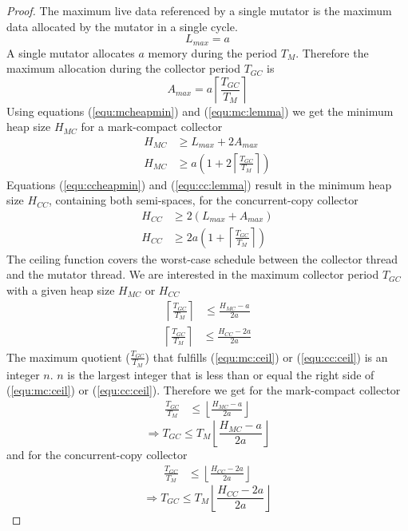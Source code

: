 \begin{proof}
The maximum live data referenced by a single mutator is the maximum
data allocated by the mutator in a single cycle.
\begin{equation}
    L_{max} = a
\end{equation}
A single mutator allocates $a$ memory during the period $T_M$.
Therefore the maximum allocation during the collector period
$T_{GC}$ is
%
\begin{equation}
    A_{max} = a \left\lceil\frac{T_{GC}}{T_{M}}\right\rceil
\end{equation}
%
Using equations (\ref{equ:mcheapmin}) and (\ref{equ:mc:lemma}) we
get the minimum heap size $H_{MC}$ for a mark-compact collector
%
\begin{align}
\nonumber
    H_{MC} & \ge L_{max} + 2 A_{max}\\
    H_{MC} & \ge a \left(1 + 2
    \left\lceil\frac{T_{GC}}{T_{M}}\right\rceil\right)
\end{align}
%
Equations (\ref{equ:ccheapmin}) and (\ref{equ:cc:lemma}) result in
the minimum heap size $H_{CC}$, containing both semi-spaces, for the
concurrent-copy collector
%
\begin{align}
\nonumber
    H_{CC} & \ge 2(L_{max} + A_{max})\\
    H_{CC} & \ge 2a \left(1 +
    \left\lceil\frac{T_{GC}}{T_{M}}\right\rceil\right)
\end{align}
%
The ceiling function covers the worst-case schedule between the
collector thread and the mutator thread. We are interested in the
maximum collector period $T_{GC}$ with a given heap size $H_{MC}$ or
$H_{CC}$
%
\begin{align}
    \label{equ:mc:ceil}
    \left\lceil\frac{T_{GC}}{T_{M}}\right\rceil &
    \le \frac{H_{MC}-a}{2a}
\end{align}
%
\begin{align}
    \label{equ:cc:ceil}
    \left\lceil\frac{T_{GC}}{T_{M}}\right\rceil &
    \le \frac{H_{CC}-2a}{2a}
\end{align}
%
The maximum quotient ($\frac{T_{GC}}{T_{M}}$) that fulfills
(\ref{equ:mc:ceil}) or (\ref{equ:cc:ceil}) is an integer $n$. $n$ is
the largest integer that is less than or equal the right side of
(\ref{equ:mc:ceil}) or (\ref{equ:cc:ceil}). Therefore we get for the
mark-compact collector
%
\begin{align}
    \label{equ:mc:floor}
    \frac{T_{GC}}{T_{M}} &
    \le \left\lfloor\frac{H_{MC}-a}{2a}\right\rfloor
\end{align}
%
\begin{equation}
    \Rightarrow T_{GC} \le T_M \left\lfloor\frac{H_{MC}-a}{2a}\right\rfloor
\end{equation}
%
and for the concurrent-copy collector
%
\begin{align}
    \label{equ:cc:floor}
    \frac{T_{GC}}{T_{M}} &
    \le \left\lfloor\frac{H_{CC}-2a}{2a}\right\rfloor
\end{align}
%
\begin{equation}
    \Rightarrow T_{GC} \le T_M \left\lfloor\frac{H_{CC}-2a}{2a}\right\rfloor
\end{equation}

\end{proof}

